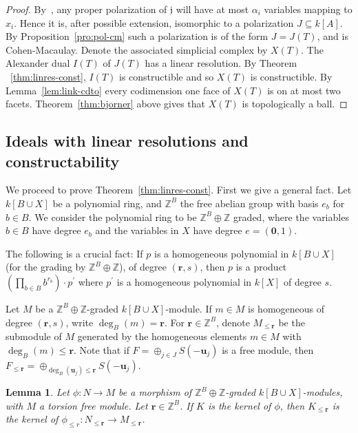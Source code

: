 \documentclass[10pt,a4paper]{article}
\newtheorem{lemma}[cdrthm]{Lemma}
\theoremstyle{definition}
\theoremstyle{remark}
\theoremstyle{plain}
\newcommand{\sus}{\subseteq}
\newcommand{\pil}{\rightarrow}
\newcommand{\hele}{{\mathbb Z}}
\newcommand{\ZZ}{{\mathbb Z}}
\newcommand{\ijfr}{{\mathfrak j}}
\newcommand{\bfr}{{\mathbf r}}
\begin{document}
\begin{proof}
  By~\cite[Remark 2.5]{AFL}, any proper polarization of $\ijfr$ will have
  at most $\alpha_i$ variables mapping to $x_i$. Hence it is, after
  possible extension, isomorphic to a polarization $J \sus k[A]$. 
  By Proposition~\ref{pro:pol-cm} such a polarization is of the
  form $J = J(T)$, and is Cohen-Macaulay. Denote the
  associated  simplicial complex by $X(T)$. 
  The Alexander dual  $I(T)$ of $J(T)$ has a linear resolution. By Theorem
 ~\ref{thm:linres-const}, $I(T)$ is constructible and so $X(T)$ is
  constructible. By Lemma~\ref{lem:link-cdto} every codimension one
  face of $X(T)$ is on at most two facets. Theorem~\ref{thm:bjorner} above
  gives that $X(T)$ is topologically a ball.
\end{proof}

\setcounter{cdrthm}{4}\setcounter{equation}{4}

\subsection{Ideals with linear resolutions and constructability}
 
We proceed to prove Theorem~\ref{thm:linres-const}.
First we give a general fact. Let $k[B \cup X]$ be a polynomial ring,
and $\hele^B$ the free abelian group with basis $e_b$ for $b \in B$.
We consider the polynomial ring to be $\hele^B \oplus \hele$ graded,
where the variables  $b \in B$ have degree $e_b$ and the variables
in $X$ have degree $e = (\mathbf 0,1)$.


The following is a crucial fact: If $p$ is a homogeneous
polynomial in $k[B \cup X]$ (for the grading by $\ZZ^B \oplus \ZZ$),
of degree $(\bfr,s)$, then $p$ is a product
$(\prod_{b \in B}b^{r_b}) \cdot p^\prime$ where $p^\prime$ is a homogeneous
polynomial in $k[X]$ of degree $s$.

Let $M$ be a $\ZZ^B \oplus \ZZ$-graded 
$k[B \cup X]$-module. If $m \in M$ is homogeneous of degree $(\bfr,s)$,
write $\deg_B(m) = \bfr$.
For $\bfr \in \ZZ^B$, denote $M_{\leq \bfr}$ be the
submodule of $M$ generated by the homogeneous elements $m \in M$
with $\deg_B(m) \leq \bfr$.
Note that if $F = \oplus_{j \in J} S(-{\mathbf u}_j)$ is a free module,
then $F_{\leq \bfr} = \oplus_{\deg_B({\mathbf u}_j) \leq \bfr} S(-{\mathbf u}_j)$.

\begin{lemma} Let $\phi : N \pil M$ be a morphism of $\ZZ^B \oplus \ZZ$-graded
  $k[B \cup X]$-modules, with $M$ a torsion free module. Let $\bfr \in \ZZ^B$. 
  If $K$ is the kernel of $\phi$, then $K_{\leq \bfr}$ is the kernel of
  $\phi_{\leq r} : N_{\leq \bfr} \pil M_{\leq \bfr}$.
\end{lemma}
\end{document}
